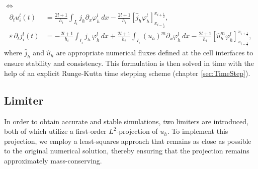 \documentclass[a4paper,12pt]{paper}
\begin{document}
$\Leftrightarrow$
\begin{equation}
	\begin{aligned}
		\partial_t u_i^l(t) &= \frac{2l+1}{h_i} \int_{I_i} j_h \partial_x\varphi_h^l  \, dx 
		- \frac{2l+1}{h_i} \left[ \widehat{j}_h \varphi_h^l \right]_{x_{i-\frac{1}{2}}}^{x_{i+\frac{1}{2}}}, \\
		\varepsilon \, \partial_t j_i^l(t) &= -\frac{2l+1}{h_i} \int_{I_i} j_h \, \varphi_h^l \, dx 
		+ \frac{2l+1}{h_i} \int_{I_i} (u_h)^m \partial_x\varphi_h^l\, dx 
		- \frac{2l+1}{h_i} \left[ \widehat{u}^m_h \varphi_h^l \right]_{x_{i-\frac{1}{2}}}^{x_{i+\frac{1}{2}}},
	\end{aligned}
	\label{eq:semidiscreteHP}
\end{equation}
where \( \widehat{j}_h \) and \( \widehat{u}_h \) are appropriate numerical fluxes defined at the cell interfaces to ensure stability and consistency. This formulation is then solved in time with the help of an explicit Runge-Kutta time stepping scheme (chapter \ref{sec:TimeStep}).


\subsection{Limiter}
In order to obtain accurate and stable simulations, two limiters are introduced, both of which utilize a first-order $L^2$-projection of $u_h$. To implement this projection, we employ a least-squares approach that remains as close as possible to the original numerical solution, thereby ensuring that the projection remains approximately mass-conserving.
\end{document}
